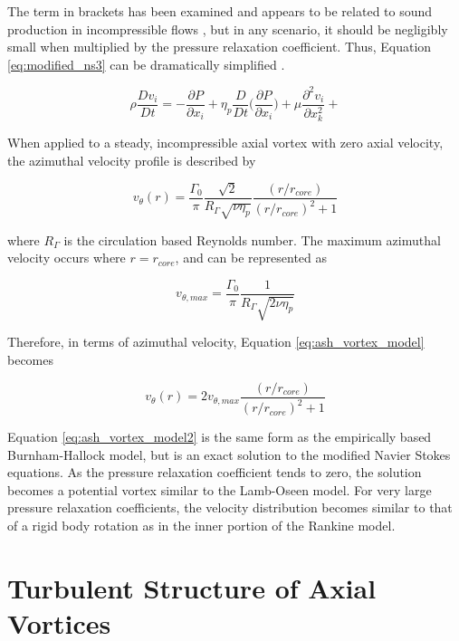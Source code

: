 The term in brackets has been examined and appears to be related to sound 
production 
in incompressible flows \cite{ash1998}, but in any scenario, it should be 
negligibly small 
when multiplied by the pressure relaxation coefficient. Thus, Equation 
\ref{eq:modified_ns3} can be dramatically simplified \cite{ash2011}.

\begin{equation}
\rho \frac{Dv_i}{Dt} = -\frac{\partial P}{\partial x_i} +
\eta_p \frac{D}{Dt} \Bigg( \frac{\partial P}{\partial x_i} \Bigg) + 
\mu \frac{\partial^2 v_i}{\partial x_{k}^2} + 
\label{eq:modified_ns4}
\end{equation}

When applied to a steady, incompressible axial vortex with zero axial velocity, 
the azimuthal velocity profile is described by

\begin{equation}
v_\theta(r) = \frac{\Gamma_0}{\pi} \frac{\sqrt{2}}{R_\Gamma \sqrt{\nu \eta_p}}
\frac{(r / r_{core})}{(r/r_{core})^2 + 1}
\label{eq:ash_vortex_model}
\end{equation}

\noindent
where $R_\Gamma$ is the circulation based Reynolds number. The maximum 
azimuthal velocity occurs where $r = r_{core}$, and can be represented as

\begin{equation}
v_{\theta, max} = \frac{\Gamma_0}{\pi} \frac{1}{R_\Gamma \sqrt{2 \nu 
\eta_p}}
\label{eq:ash_vthetamax}
\end{equation}

\noindent
Therefore, in terms of azimuthal velocity, Equation \ref{eq:ash_vortex_model} 
becomes

\begin{equation}
v_\theta(r) = 2 v_{\theta, max}\frac{(r / r_{core})}{(r/r_{core})^2 + 1}
\label{eq:ash_vortex_model2}
\end{equation}

Equation \ref{eq:ash_vortex_model2} is the same form as the 
empirically based Burnham-Hallock model, but is an exact solution to the 
modified Navier Stokes equations. As the pressure relaxation coefficient 
tends to zero, the solution becomes a potential vortex similar to the 
Lamb-Oseen model. For very large pressure relaxation coefficients, the velocity 
distribution becomes similar to that of a rigid body rotation as in the inner 
portion of the Rankine model.


\section{Turbulent Structure of Axial Vortices}

